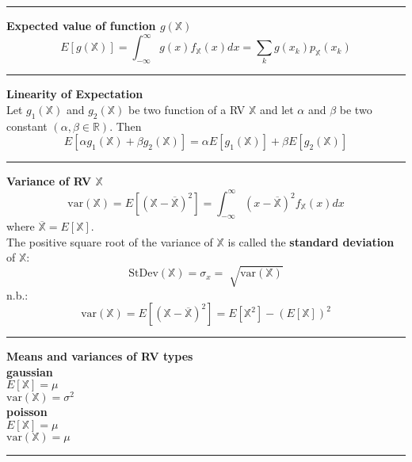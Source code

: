 \documentclass{article}
\providecommand{\X}{\mathbb{X}}
\providecommand{\R}{\mathbb{R}}
\begin{document}
\begin{multicols*}{3}
        \noindent\rule{\columnwidth}{0.4pt}

        \textbf{Expected value of function $g(\X)$}
        \begin{equation*}
            E[g(\X)] = \int_{-\infty}^{\infty} g(x)f_{\X}(x)dx = \sum_k g(x_k)p_{\X}(x_k)
        \end{equation*}

        \noindent\rule{\columnwidth}{0.4pt}

        \textbf{Linearity of Expectation}\\
        Let $g_1(\X)$ and $g_2(\X)$ be two function of a RV $\X$ and let $\alpha$ and $\beta$ be two constant $(\alpha, \beta\in\R)$.
        Then
        \begin{equation*}
            E[\alpha g_1(\X) + \beta g_2(\X)] = \alpha E[g_1(\X)] + \beta E[g_2(\X)]
        \end{equation*}

        \noindent\rule{\columnwidth}{0.4pt}

        \textbf{Variance of RV $\X$}
        \begin{equation*}
            \text{var}(\X) = E[(\X - \overline{\X})^2] = \int_{-\infty}^{\infty}(x-\overline{\X})^2 f_\X(x)dx
        \end{equation*}
        where $\overline{\X} = E[\X]$.\\
        The positive square root of the variance of $\X$ is called the \textbf{standard deviation} of $\X$:
        \begin{equation*}
            \text{StDev}(\X) = \sigma_x = \sqrt[]{\text{var}(\X)}
        \end{equation*}
        n.b.:
        \begin{equation*}
            \text{var}(\X) = E[(\X - \overline{\X})^2] = E[\X^2] - (E[\X])^2
        \end{equation*}

        \noindent\rule{\columnwidth}{0.4pt}

        \textbf{Means and variances of RV types}\\
        \textbf{gaussian}\\
        $E[\X] = \mu$\\
        $\text{var}(\X) = \sigma^2$\\
        \textbf{poisson}\\
        $E[\X] = \mu$\\
        $\text{var}(\X) = \mu$

        \noindent\rule{\columnwidth}{0.4pt}


\end{multicols*}
\end{document}
